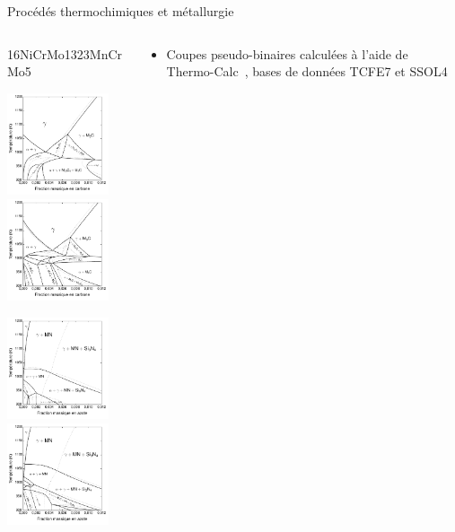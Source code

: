 \documentclass[aspectratio=169,pdf,t]{beamer}
\begin{document}
\begin{frame}{\insertsection}{Procédés thermochimiques et métallurgie}
	\begin{columns}[T]
		\begin{column}{0.5\textwidth}
			\centering{}
			\hspace{0.7cm}16NiCrMo13\hspace{2.0cm}23MnCrMo5\hfill
			
			\hfill\includegraphics[width=3cm]{figures/pseudo-binaire-aero-c}
			\hfill\includegraphics[width=3cm]{figures/pseudo-binaire-auto-c}
			\hfill
			
			\vspace{0.3cm}
			\hfill\includegraphics[width=3cm]{figures/pseudo-binaire-aero-n}
			\hfill\includegraphics[width=3cm]{figures/pseudo-binaire-auto-n}
			\hfill		
		\end{column}
		\begin{column}{0.5\textwidth}
          
          \begin{itemize}
            \def\itemskip{\\[18pt]}
            \item \alert<1->{Coupes pseudo-binaires calculées à l'aide de Thermo-Calc~\cite{Andersson2002,Borgenstam2000}, bases de données TCFE7 et SSOL4}
            \itemskip
            

\end{itemize}
\end{column}
\end{columns}
\end{frame}
\end{document}
